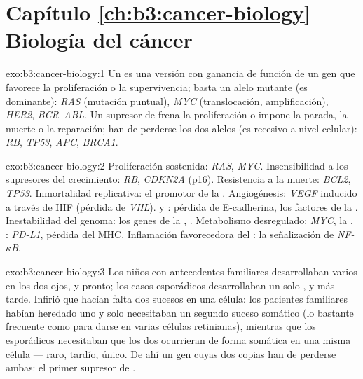 \section*{Capítulo \ref{ch:b3:cancer-biology} --- Biología del cáncer}

\begin{solution}{exo:b3:cancer-biology:1}
Un  es una versión con ganancia de función de un gen que favorece
la proliferación o la supervivencia; basta un alelo mutante (es
dominante): \emph{RAS} (mutación puntual), \emph{MYC} (translocación,
amplificación), \emph{HER2}, \emph{BCR--ABL}. Un supresor de 
frena la proliferación o impone la parada, la muerte o la reparación; han
de perderse los dos alelos (es recesivo a nivel celular): \emph{RB},
\emph{TP53}, \emph{APC}, \emph{BRCA1}.
\end{solution}

\begin{solution}{exo:b3:cancer-biology:2}
Proliferación sostenida: \emph{RAS}, \emph{MYC}. Insensibilidad a los
supresores del crecimiento: \emph{RB}, \emph{CDKN2A} (p16). Resistencia a
la muerte: \emph{BCL2}, \emph{TP53}. Inmortalidad replicativa: el
promotor de la . Angiogénesis: \emph{VEGF} inducido a través de
HIF (pérdida de \emph{VHL}).  y : pérdida de
E-cadherina, los factores de la .
Inestabilidad del genoma: los genes de la , \emph{}. Metabolismo desregulado: \emph{MYC}, la . : \emph{PD-L1}, pérdida del MHC. Inflamación
favorecedora del : la señalización de \emph{NF-$\kappa$B}.
\end{solution}

\begin{solution}{exo:b3:cancer-biology:3}
Los niños con antecedentes familiares desarrollaban varios  en los
dos ojos, y pronto; los casos esporádicos desarrollaban un solo , y
más tarde. Infirió que hacían falta dos sucesos en una célula: los
pacientes familiares habían heredado uno y solo necesitaban un segundo
suceso somático (lo bastante frecuente como para darse en varias células
retinianas), mientras que los esporádicos necesitaban que los dos
ocurrieran de forma somática en una misma célula --- raro, tardío, único.
De ahí un gen cuyas dos copias han de perderse ambas: el primer supresor
de .
\end{solution}

